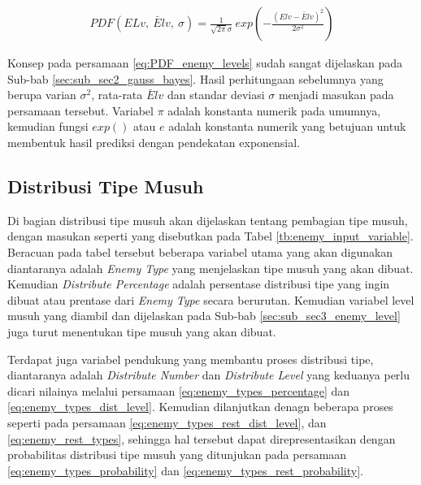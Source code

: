 \begin{equation}\label{eq:PDF_enemy_levels}
\begin{split}
PDF(ELv,\ \bar{E}lv,\ \sigma) = \frac{1}{\sqrt{2 \pi} \sigma}\ exp \left(-\frac{(Elv - \bar{E}lv)^2}{2 \sigma^2}\right)
\end{split}
\end{equation}

Konsep pada persamaan \ref{eq:PDF_enemy_levels} sudah sangat dijelaskan pada Sub-bab \ref{sec:sub_sec2_gauss_bayes}. Hasil perhitungaan sebelumnya yang berupa varian $\sigma^2$, rata-rata $\bar{E}lv$ dan standar deviasi $\sigma$ menjadi masukan pada persamaan tersebut. Variabel $\pi$ adalah konstanta numerik pada umumnya, kemudian fungsi $exp()$ atau $e$ adalah konstanta numerik yang betujuan untuk membentuk hasil prediksi dengan pendekatan exponensial.
\vspace{1ex}

\subsection{Distribusi Tipe Musuh}
\label{sec:sub_sec3_enemy_type}
\vspace{1ex}

Di bagian distribusi tipe musuh akan dijelaskan tentang pembagian tipe musuh, dengan masukan seperti yang disebutkan pada Tabel \ref{tb:enemy_input_variable}. Beracuan pada tabel tersebut beberapa variabel utama yang akan digunakan diantaranya adalah \textit{Enemy Type} yang menjelaskan tipe musuh yang akan dibuat. Kemudian \textit{Distribute Percentage} adalah persentase distribusi tipe yang ingin dibuat atau prentase dari \textit{Enemy Type} secara berurutan. Kemudian variabel level musuh yang diambil dan dijelaskan pada Sub-bab \ref{sec:sub_sec3_enemy_level} juga turut menentukan tipe musuh yang akan dibuat.
\vspace{1ex}

Terdapat juga variabel pendukung yang membantu proses distribusi tipe, diantaranya adalah \textit{Distribute Number} dan \textit{Distribute Level} yang keduanya perlu dicari nilainya melalui  persamaan \ref{eq:enemy_types_percentage} dan \ref{eq:enemy_types_dist_level}. Kemudian dilanjutkan denagn beberapa proses seperti pada persamaan \ref{eq:enemy_types_rest_dist_level}, dan \ref{eq:enemy_rest_types}, sehingga hal tersebut dapat direpresentasikan dengan probabilitas distribusi tipe musuh yang ditunjukan pada persamaan \ref{eq:enemy_types_probability} dan \ref{eq:enemy_types_rest_probability}.
\vspace{1ex}

